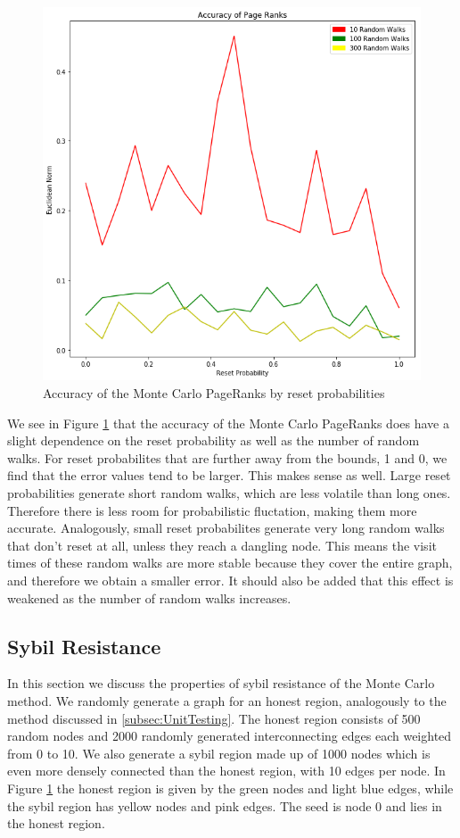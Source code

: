 \documentclass[sigconf]{acmart}
\theoremstyle{definition}
\begin{document}
\begin{figure}
\includegraphics[scale=0.385]{Accuracy2}
\caption{Accuracy of the Monte Carlo PageRanks by reset probabilities}
\label{fig:Accuracy2}
\end{figure}

\noindent We see in Figure \ref{fig:Accuracy2} that the accuracy of the Monte Carlo PageRanks does have a slight dependence on the reset probability as well as the number of random walks. For reset probabilites that are further away from the bounds, 1 and 0, we find that the error values tend to be larger. This makes sense as well. Large reset probabilities generate short random walks, which are less volatile than long ones. Therefore there is less room for probabilistic fluctation, making them more accurate. Analogously, small reset probabilites generate very long random walks that don't reset at all, unless they reach a dangling node. This means the visit times of these random walks are more stable because they cover the entire graph, and therefore we obtain a smaller error. It should also be added that this effect is weakened as the number of random walks increases.
\subsection{Sybil Resistance}
\label{subsec:SybilResistance}
In this section we discuss the properties of sybil resistance of the Monte Carlo method. We randomly generate a graph for an honest region, analogously to the method discussed in \ref{subsec:UnitTesting}. The honest region consists of 500 random nodes and 2000 randomly generated interconnecting edges each weighted from 0 to 10. We also generate a sybil region made up of 1000 nodes which is even more densely connected than the honest region, with 10 edges per node. In Figure \ref{fig:Accuracy2} the honest region is given by the green nodes and light blue edges, while the sybil region has yellow nodes and pink edges. The seed is node 0 and lies in the honest region.
\end{document}
